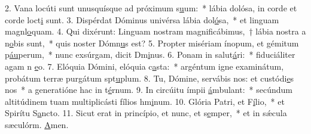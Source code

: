 2. Vana locúti sunt unusquísque ad próximum s\uline{u}um:~* lábia dolósa, in corde et corde loct\uline{i} sunt.
3. Dispérdat Dóminus univérsa lábia dol\uline{ó}sa,~* et linguam magnl\uline{o}quam.
4. Qui dixérunt: Linguam nostram magnificábimus,~† lábia nostra a n\uline{o}bis sunt,~* quis noster Dómn\uline{u}s est?
5. Propter misériam ínopum, et gémitum p\uline{áu}perum,~* nunc exsúrgam, dicit Dm\uline{i}nus.
6. Ponam in salut\uline{á}ri:~* fiduciáliter agam n \uline{e}o.
7. Elóquia Dómini, elóquia c\uline{a}sta:~* argéntum igne examinátum, probátum terræ purgátum spt\uline{u}plum.
8. Tu, Dómine, servábis nos: et custódi\uline{e}s nos~* a generatióne hac in t\uline{é}rnum.
9. In circúitu ímpii \uline{á}mbulant:~* secúndum altitúdinem tuam multiplicásti fílios hm\uline{i}num.
10. Glória Patri, et F\uline{í}lio,~* et Spirítu S\uline{a}ncto.
11. Sicut erat in princípio, et nunc, et s\uline{e}mper,~* et in sǽcula sæculórm. \uline{A}men.
